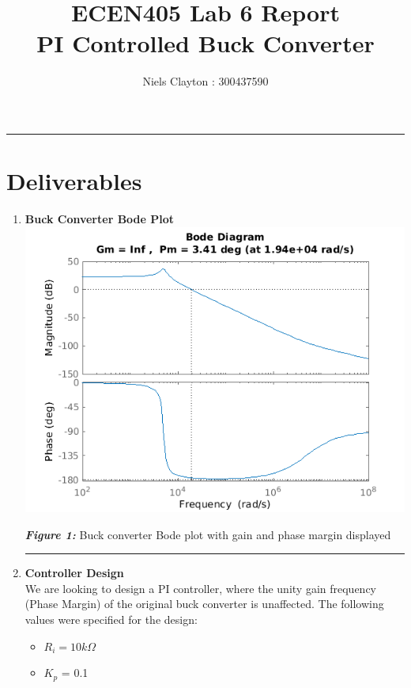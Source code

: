 \documentclass[a4paper,11pt]{article}
\begin{document}
\begin{preview}
\title{\LARGE{\textbf{ECEN405 Lab 6 Report\\PI Controlled Buck Converter}}}
\author{Niels Clayton : 300437590}
\date{}
\maketitle
\hrule

\section*{Deliverables}

\begin{enumerate}
    \item \textbf{Buck Converter Bode Plot} \\

    \includegraphics[width = \textwidth]{uncontrolled_buck.png}
    
    \begin{center}
        \textbf{\textit{Figure 1:}} Buck converter Bode plot with gain and phase margin displayed\\
    \end{center}


    \hrule
    \item \textbf{Controller Design} \\
    
    We are looking to design a PI controller, where the unity gain frequency (Phase Margin) of the original buck converter is unaffected. The following values were specified for the design:
    \begin{itemize}
        \item $R_i = 10k\Omega$
        \item $K_p$ = 0.1
    \end{itemize}


\end{enumerate}
\end{preview}
\end{document}
